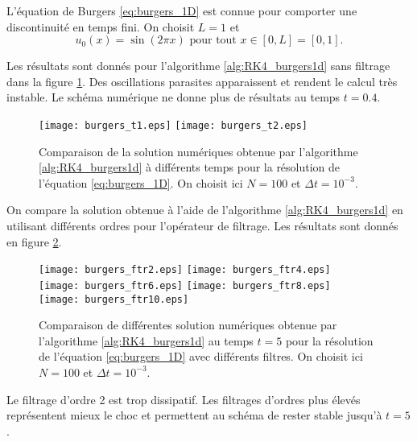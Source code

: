 L'équation de Burgers \eqref{eq:burgers_1D} est connue pour comporter une discontinuité en temps fini. On choisit $L=1$ et
\begin{equation}
u_0(x) = \sin ( 2 \pi x) \text{ pour tout } x \in [0,L]=[0,1].
\end{equation}

Les résultats sont donnés pour l'algorithme \ref{alg:RK4_burgers1d} sans filtrage dans la figure \ref{fig:comp_burgers}. Des oscillations parasites apparaissent et rendent le calcul très instable. Le schéma numérique ne donne plus de résultats au temps $t=0.4$.
\begin{figure}[htbp]
\begin{center}
\texttt{[image: burgers\_t1.eps]}
\texttt{[image: burgers\_t2.eps]}
\end{center}
\caption{Comparaison de la solution numériques obtenue par l'algorithme \ref{alg:RK4_burgers1d} à différents temps pour la résolution de l'équation \eqref{eq:burgers_1D}. On choisit ici $N=100$ et $\Delta t = 10^{-3}$.}
\label{fig:comp_burgers}
\end{figure}
On compare la solution obtenue à l'aide de l'algorithme \ref{alg:RK4_burgers1d} en utilisant différents ordres pour l'opérateur de filtrage. Les résultats sont donnés en figure \ref{fig:comp_burgers_ftr}.
\begin{figure}[htbp]
\begin{center}
\texttt{[image: burgers\_ftr2.eps]}
\texttt{[image: burgers\_ftr4.eps]}\\
\texttt{[image: burgers\_ftr6.eps]}
\texttt{[image: burgers\_ftr8.eps]}\\
\texttt{[image: burgers\_ftr10.eps]}
\end{center}
\caption{Comparaison de différentes solution numériques obtenue par l'algorithme \ref{alg:RK4_burgers1d} au temps $t=5$ pour la résolution de l'équation \eqref{eq:burgers_1D} avec différents filtres. On choisit ici $N=100$ et $\Delta t = 10^{-3}$.}
\label{fig:comp_burgers_ftr}
\end{figure}
Le filtrage d'ordre 2 est trop dissipatif. Les filtrages d'ordres plus élevés représentent mieux le choc et permettent au schéma de rester stable jusqu'à $t=5$.























